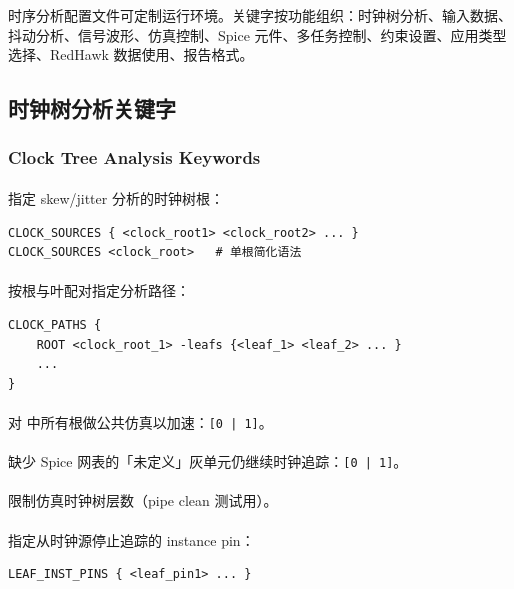 时序分析配置文件可定制运行环境。关键字按功能组织：时钟树分析、输入数据、抖动分析、信号波形、仿真控制、Spice 元件、多任务控制、约束设置、应用类型选择、RedHawk 数据使用、报告格式。

\subsection{时钟树分析关键字}
\subsubsection*{Clock Tree Analysis Keywords}

\paragraph{}
指定 skew/jitter 分析的时钟树根：
\begin{lstlisting}
CLOCK_SOURCES { <clock_root1> <clock_root2> ... }
CLOCK_SOURCES <clock_root>   # 单根简化语法
\end{lstlisting}

\paragraph{}
按根与叶配对指定分析路径：
\begin{lstlisting}
CLOCK_PATHS {
    ROOT <clock_root_1> -leafs {<leaf_1> <leaf_2> ... }
    ...
}
\end{lstlisting}

\paragraph{}
对  中所有根做公共仿真以加速：\texttt{[0 | 1]}。

\paragraph{}
缺少 Spice 网表的「未定义」灰单元仍继续时钟追踪：\texttt{[0 | 1]}。

\paragraph{}
限制仿真时钟树层数（pipe clean 测试用）。

\paragraph{}
指定从时钟源停止追踪的 instance pin：
\begin{lstlisting}
LEAF_INST_PINS { <leaf_pin1> ... }
\end{lstlisting}

